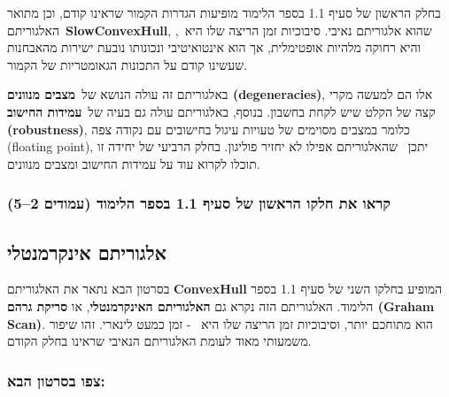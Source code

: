 \documentclass[
]{book}
\theoremstyle{definition}
\theoremstyle{definition}
\theoremstyle{definition}
\theoremstyle{definition}
\theoremstyle{remark}
\begin{document}
בחלק הראשון של סעיף 1.1 בספר הלימוד מופיעות הגדרות הקמור שראינו קודם, וכן מתואר האלגוריתם~\textbf{SlowConvexHull}, שהוא אלגוריתם נאיבי. סיבוכיות זמן הריצה שלו היא~, והיא רחוקה מלהיות אופטימלית, אך הוא אינטואיטיבי ונכונותו נובעת ישירות מהאבחנות שעשינו קודם על התכונות הגאומטריות של הקמור.~

באלגוריתם זה עולה הנושא של~\textbf{מצבים מנוונים (degeneracies)}, אלו הם למעשה מקרי קצה של הקלט שיש לקחת בחשבון. בנוסף, באלגוריתם עולה גם בעיה של~\textbf{עמידות החישוב (robustness)}, כלומר במצבים מסוימים של טעויות עיגול בחישובים עם נקודה צפה (floating point), יתכן~ שהאלגוריתם אפילו לא יחזיר פוליגון. בחלק הרביעי של יחידה זו תוכלו לקרוא עוד על עמידות החישוב ומצבים מנוונים.

\hypertarget{ux5e7ux5e8ux5d0ux5d5-ux5d0ux5ea-ux5d7ux5dcux5e7ux5d5-ux5d4ux5e8ux5d0ux5e9ux5d5ux5df-ux5e9ux5dc-ux5e1ux5e2ux5d9ux5e3-1.1-ux5d1ux5e1ux5e4ux5e8-ux5d4ux5dcux5d9ux5deux5d5ux5d3-ux5e2ux5deux5d5ux5d3ux5d9ux5dd-25}{%
\subsubsection{קראו את חלקו הראשון של סעיף 1.1 בספר הלימוד (עמודים 2--5)}\label{ux5e7ux5e8ux5d0ux5d5-ux5d0ux5ea-ux5d7ux5dcux5e7ux5d5-ux5d4ux5e8ux5d0ux5e9ux5d5ux5df-ux5e9ux5dc-ux5e1ux5e2ux5d9ux5e3-1.1-ux5d1ux5e1ux5e4ux5e8-ux5d4ux5dcux5d9ux5deux5d5ux5d3-ux5e2ux5deux5d5ux5d3ux5d9ux5dd-25}}

\hypertarget{ux5d0ux5dcux5d2ux5d5ux5e8ux5d9ux5eaux5dd-ux5d0ux5d9ux5e0ux5e7ux5e8ux5deux5e0ux5d8ux5dcux5d9}{%
\subsection{\texorpdfstring{\textbf{אלגוריתם אינקרמנטלי}}{אלגוריתם אינקרמנטלי}}\label{ux5d0ux5dcux5d2ux5d5ux5e8ux5d9ux5eaux5dd-ux5d0ux5d9ux5e0ux5e7ux5e8ux5deux5e0ux5d8ux5dcux5d9}}

בסרטון הבא נתאר את האלגוריתם \textbf{ConvexHull} המופיע בחלקו השני של סעיף 1.1 בספר הלימוד. האלגוריתם הזה נקרא גם \textbf{האלגוריתם האינקרמנטלי}, או \textbf{סריקת גרהם (Graham Scan)}. הוא מתוחכם יותר, וסיבוכיות זמן הריצה שלו היא ~- זמן כמעט לינארי. זהו שיפור משמעותי מאוד לעומת האלגוריתם הנאיבי שראינו בחלק הקודם.~

\hypertarget{ux5e6ux5e4ux5d5-ux5d1ux5e1ux5e8ux5d8ux5d5ux5df-ux5d4ux5d1ux5d0}{%
\subsubsection{צפו בסרטון הבא:}\label{ux5e6ux5e4ux5d5-ux5d1ux5e1ux5e8ux5d8ux5d5ux5df-ux5d4ux5d1ux5d0}}
\end{document}
